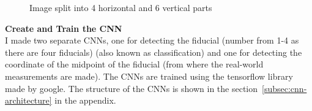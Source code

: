 \begin{figure}[H]
    \centering
    \caption{Image split into 4 horizontal and 6 vertical parts}
    \label{fig:fiducials_parts}
\end{figure}
\textbf{Create and Train the CNN}\\
I made two separate CNNs, one for detecting the fiducial (number from 1-4 as there are four fiducials) (also known as classification) and one for detecting the coordinate of the midpoint of the fiducial (from where the real-world measurements are made).
The CNNs are trained using the tensorflow\autocite{tf} library made by google.
The structure of the CNNs is shown in the section~\ref{subsec:cnn-architecture} in the appendix.

